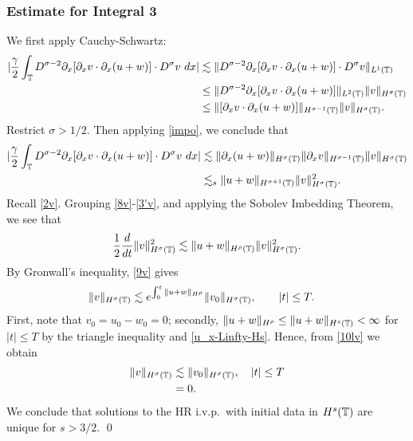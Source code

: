 \subsubsection{Estimate for Integral 3}
We first apply
Cauchy-Schwartz:
\begin{equation*}
\begin{split}
|\frac{\gamma}{2} \int_{\mathbb{T}} D^{\sigma -2} \partial_x [ \partial_x v
\cdot \partial_x (u+w)]\cdot D^\sigma v \ dx| & \lesssim  \|D^{\sigma -2} \partial_x
[\partial_x v \cdot \partial_x (u+w)] \cdot D^\sigma v  \|_{L^1(\mathbb{T})} 
\\
& \le   \|D^{\sigma -2} \partial_x
[\partial_x v \cdot \partial_x (u+w)] \|_{L^2(\mathbb{T})}
\|v\|_{H^\sigma(\mathbb{T})}
\\
& \le 
\|[\partial_x v \cdot \partial_x (u+w)] \|_{H^{\sigma -1}(\mathbb{T})}
\|v\|_{H^\sigma(\mathbb{T})}.
\end{split}
\end{equation*}
Restrict $\sigma > 1/2$. Then applying \eqref{impo}, we conclude
that
\begin{equation}
\begin{split}
|\frac{\gamma}{2} \int_{\mathbb{T}} D^{\sigma -2} \partial_x [ \partial_x v
\cdot \partial_x (u+w)]\cdot D^\sigma v \ dx|& \lesssim 
\|\partial_x(u+w) \|_{H^{\sigma}(\mathbb{T})}
\|\partial_x v\|_{H^{\sigma -1}(\mathbb{T})} \|v\|_{H^\sigma(\mathbb{T})}
\\
& \lesssim_{s} \|u+w \|_{H^{\sigma + 1}(\mathbb{T})}
\|v\|_{H^\sigma(\mathbb{T})}^2.
\label{3'v}
\end{split}
\end{equation}
Recall \eqref{2v}. Grouping \eqref{8v}-\eqref{3'v}, and applying
the Sobolev Imbedding Theorem, we see that 
\begin{equation}
\begin{split}
\frac{1}{2} \frac{d}{dt}
\|v\|_{H^\sigma(\mathbb{T})}^2 \lesssim \|u+w\|_{H^\rho(\mathbb{T})}
\|v\|_{H^\sigma(\mathbb{T})}^2.
\label{9v}
\end{split}
\end{equation}
By Gronwall's inequality, \eqref{9v} gives
\begin{equation}
\label{10lv}
\begin{split}
\|v\|_{H^\sigma(\mathbb{T})}
& \lesssim e^{\int_0^t \|u+w\|_{H^{\rho}}}
\|v_0\|_{H^\sigma(\mathbb{T})}, \qquad |t| \le T.
\end{split}
\end{equation}
First, note that $v_0 = u_0 - w_0 = 0$; secondly, $\|u + w \|_{H^\rho}
\le \|u + w \|_{H^s(\mathbb{T})} < \infty$ for $|t| \le T$ by
the triangle inequality and \eqref{u_x-Linfty-Hs}. Hence, from
\eqref{10lv} we obtain
\begin{equation*}
\begin{split}
\|v\|_{H^\sigma(\mathbb{T})}
& \lesssim \|v_0\|_{H^\sigma(\mathbb{T})}, \quad |t| \le T	
\\
& = 0.
\end{split}
\end{equation*}
We conclude that solutions to the HR i.v.p.\ with initial data in
$H^s(\mathbb{T})$ are unique for $s > 3/2$.  \qed
%
%
%
%
